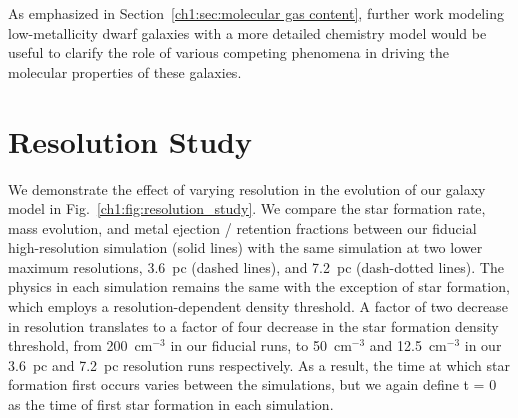 As emphasized in Section~\ref{ch1:sec:molecular gas content}, further work modeling low-metallicity dwarf galaxies with a more detailed chemistry model would be useful to clarify the role of various competing phenomena in driving the molecular properties of these galaxies.

\setcounter{figure}{0}
\section{Resolution Study}
\label{appendix:resolution_study}

We demonstrate the effect of varying resolution in the evolution of our galaxy model in Fig.~\ref{ch1:fig:resolution_study}. We compare the star formation rate, mass evolution, and metal ejection / retention fractions between our fiducial high-resolution simulation (solid lines) with the same simulation at two lower maximum resolutions, 3.6~pc (dashed lines), and 7.2~pc (dash-dotted lines). The physics in each simulation remains the same with the exception of star formation, which employs a resolution-dependent density threshold. A factor of two decrease in resolution translates to a factor of four decrease in the star formation density threshold, from 200~cm$^{-3}$ in our fiducial runs, to 50~cm$^{-3}$ and 12.5~cm$^{-3}$ in our 3.6~pc and 7.2~pc resolution runs respectively. As a result, the time at which star formation first occurs varies between the simulations, but we again define t = 0 as the time of first star formation in each simulation.


